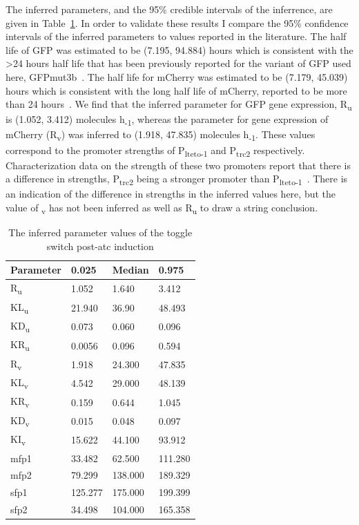 The inferred parameters, and the 95\% credible intervals of the inferrence, are given in Table~\ref{tab:inf_params_atc}. In order to validate these results I compare the 95\% confidence intervals of the inferred parameters to values reported in the literature. The half life of GFP was estimated to be (7.195, 94.884) hours which is consistent with the \textgreater 24 hours half life that has been previously reported for the variant of GFP used here, GFPmut3b~\autocite{Andersen:1998tn}. The half life for mCherry was estimated to be (7.179, 45.039) hours which is consistent with the long half life of mCherry, reported to be more than 24 hours~\autocite{Shaner:2004vy}. We find that the inferred parameter for GFP gene expression, R\textsubscript{u} is (1.052, 3.412) molecules h\textsubscript{-1}, whereas the parameter for gene expression of mCherry (R\textsubscript{v}) was inferred to (1.918, 47.835) molecules h\textsubscript{-1}. These values correspond to the promoter strengths of P\textsubscript{lteto-1} and P\textsubscript{trc2} respectively. Characterization data on the strength of these two promoters report that there is a difference in strengths, P\textsubscript{trc2} being a stronger promoter than P\textsubscript{lteto-1}~\autocite{Litcofsky:2012gr}. There is an indication of the difference in strengths in the inferred values here, but the value of \textsubscript{v} has not been inferred as well as R\textsubscript{u} to draw a string conclusion.


\begin{table}[tb]
\centering
\caption{The inferred parameter values of the toggle switch post-\acrshort{atc} induction}
\label{tab:inf_params_atc}
\begin{tabular}{@{}llll@{}}
\toprule
Parameter & 0.025 & Median & 0.975 \\ \midrule
R\textsubscript{u} & 1.052 & 1.640 & 3.412 \\
KL\textsubscript{u} & 21.940 & 36.90 & 48.493 \\
KD\textsubscript{u} & 0.073 & 0.060 & 0.096 \\
KR\textsubscript{u} & 0.0056 & 0.096 & 0.594 \\
R\textsubscript{v} & 1.918 & 24.300 & 47.835 \\
KL\textsubscript{v} & 4.542 & 29.000 & 48.139 \\
KR\textsubscript{v} & 0.159 & 0.644 & 1.045 \\
KD\textsubscript{v} & 0.015 & 0.048 & 0.097 \\
KI\textsubscript{v} & 15.622 & 44.100 & 93.912 \\
mfp1 & 33.482 & 62.500 & 111.280 \\
mfp2 & 79.299 & 138.000 & 189.329 \\
sfp1 & 125.277 & 175.000 & 199.399 \\
sfp2 & 34.498 & 104.000 & 165.358 \\ \bottomrule
\end{tabular}
\end{table}

